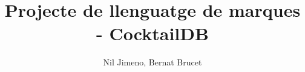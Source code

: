 

\title{\textbf{Projecte de llenguatge de marques - CocktailDB}}
\author{Nil Jimeno, Bernat Brucet}


\maketitle







\pagebreak

\pagebreak

\pagebreak

\pagebreak




